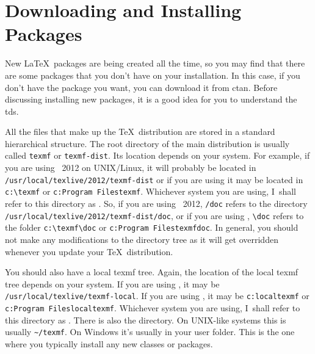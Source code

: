
\appendix


\chapter{Downloading and Installing Packages}
\label{ch:installsty}

New \LaTeX\ packages are being created all the time, so you may find that there are some
packages that you don't have on your installation. In this case, if
you don't have the package you want, you can download
it from
\gls{ctan}. Before discussing installing new packages, it is
a good idea for you to understand the \gls{tds}.

All the files that make up the \TeX\ distribution are stored in a
standard hierarchical structure. The root directory of the main
distribution is usually called \texttt{texmf} or \texttt{texmf-dist}. Its location
depends on your system. For example, if you are using
~2012 on UNIX/Linux, it will probably be located in
\texttt{/usr\slash local\slash texlive\slash 2012\slash texmf-dist} or if you are using  it
may be located in \verb|c:\texmf| or \texttt{c:\backslashsym Program
Files\backslashsym texmf}. Whichever system you are using, I~shall
refer to this directory as . So, if you are using
~2012, \texttt{\slash doc} refers to the directory
\texttt{/usr\slash local\slash texlive\slash 2012\slash texmf-dist\slash doc}, or if you are using
, \verb|\doc| refers to the folder
\verb|c:\texmf\doc| or \texttt{c:\backslashsym Program
Files\backslashsym texmf\backslashsym doc}.
In general, you should not make any modifications to the
 directory tree as it will get overridden whenever you
update your \TeX\ distribution.

You should also have a local texmf tree. Again, the location of the
local texmf tree depends on your system. If you are using
, it may be 
\texttt{/usr\slash local\slash texlive\slash texmf-local}. 
If you are using , it
may be \texttt{c:\backslashsym localtexmf} or
\texttt{c:\backslashsym Program Files\backslashsym localtexmf}.
Whichever system you are using, I~shall refer to this directory as
. There is also the  directory.
On UNIX-like systems this is usually \verb|~/texmf|. On Windows it's
usually in your user folder. This is the one where you typically
install any new classes or packages.

